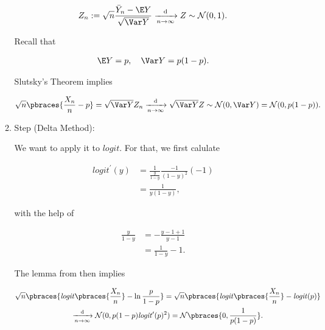 \begin{solution}
\begin{enumerate}[label = (\alph*)]
\begin{enumerate}[label = \arabic*.]
        \begin{align*}
            Z_n
            :=
            \sqrt n \frac{\bar Y_n - \E Y}{\sqrt{\Var Y}}
            \xrightarrow[n \to \infty]{\mathrm d}
            Z
            \sim
            \mathcal N(0, 1).
        \end{align*}

        Recall that

        \begin{align*}
            \E Y = p,
            \quad
            \Var Y = p (1 - p).
        \end{align*}

        Slutsky's Theorem \cite*[Lecture 4, Slide 70]{EStat} implies

        \begin{align*}
            \sqrt n \pbraces{\frac{X_n}{n} - p}
            =
            \sqrt{\Var Y} Z_n
            \xrightarrow[n \to \infty]{\mathrm d}
            \sqrt{\Var Y} Z
            \sim
            \mathcal N(0, \Var Y)
            =
            \mathcal N(0, p (1 - p)).
        \end{align*}

        \item Step (Delta Method):
        
        We want to apply it to $\mathit{logit}$.
        For that, we first calulate

        \begin{align*}
            \mathit{logit}^\prime(y)
            & =
            \frac{1}{\frac{y}{1 - y}} \frac{-1}{(1 - y)^2} (-1) \\
            & =
            \frac{1}{y (1 - y)},
        \end{align*}

        with the help of

        \begin{align*}
            \frac{y}{1 - y}
            & =
            -\frac{y - 1 + 1}{y - 1} \\
            & =
            \frac{1}{1 - y} - 1.
        \end{align*}

        The lemma from \cite*[Lecture 5, Slide 10]{EStat} then implies

        \begin{multline*}
            \sqrt n \pbraces{\mathit{logit} \pbraces{\frac{X_n}{n}} - \ln \frac{p}{1 - p}}
            =
            \sqrt n \pbraces{\mathit{logit} \pbraces{\frac{X_n}{n}} - \mathit{logit}(p)} \\
            \xrightarrow[n \to \infty]{\mathrm d}
            \mathcal N(0, p (1 - p) \mathit{logit}^\prime(p)^2)
            =
            \mathcal N \pbraces{0, \frac{1}{p (1 - p)}}.
        \end{multline*}


\end{enumerate}
\end{enumerate}
\end{solution}
